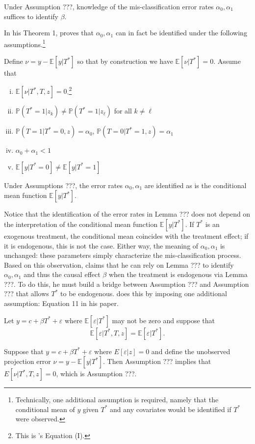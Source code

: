\begin{lem}[Mahajan A2]
Under Assumption ???, knowledge of the mis-classification error rates $\alpha_0, \alpha_1$ suffices to identify $\beta$.
\end{lem}

In his Theorem 1, \cite{Mahajan} proves that $\alpha_0, \alpha_1$ can in fact be identified under the following assumptions.\footnote{Technically, one additional assumption is required, namely that the conditional mean of $y$ given $T^*$ and any covariates would be identified if $T^*$ were observed.}
\begin{assump}[Mahajan A1] Define $\nu = y - \mathbb{E}[y|T^*]$ so that by construction we have $\mathbb{E}[\nu|T^*]=0$. Assume that
  \begin{enumerate}[(i)]
    \item $\mathbb{E}[\nu|T^*,T,z] = 0$.\footnote{This is \citeauthor{Mahajan}'s Equation (I).}
    \item $\mathbb{P}(T^*=1|z_k)\neq \mathbb{P}(T^*=1|z_\ell)$ for all $k\neq \ell$
    \item $\mathbb{P}(T = 1| T^* = 0, z) = \alpha_0$,  $\mathbb{P}(T = 0| T^* = 1, z) = \alpha_1$
    \item $\alpha_0 + \alpha_1 < 1$
    \item $\mathbb{E}[y|T^*=0]\neq \mathbb{E}[y|T^*=1]$
  \end{enumerate}
\end{assump}
\begin{lem}
  Under Assumptions ???, the error rates $\alpha_0, \alpha_1$ are identified as is the conditional mean function $\mathbb{E}[y|T^*]$.
\end{lem}

Notice that the identification of the error rates in Lemma ??? does not depend on the interpretation of the conditional mean function $\mathbb{E}[y|T^*]$.
If $T^*$ is an exogenous treatment, the conditional mean coincides with the treatment effect; if it is endogenous, this is not the case.
Either way, the meaning of $\alpha_0, \alpha_1$ is unchanged: these parameters simply characterize the mis-classification process. 
Based on this observation, \cite{Mahajan} claims that he can rely on Lemma ??? to identify $\alpha_0,\alpha_1$ and thus the causal effect $\beta$ when the treatment is endogenous via Lemma ???.
To do this, he must build a bridge between Assumption ??? and Assumption ??? that allows $T^*$ to be endogenous.
\cite{Mahajan} does this by imposing one additional assumption: Equation 11 in his paper.
\begin{assump}
  Let $y = c + \beta T^* + \varepsilon$ where $\mathbb{E}[\varepsilon|T^*]$ may not be zero and suppose that 
  \[\mathbb{E}[\varepsilon|T^*,T,z] = \mathbb{E}[\varepsilon|T^*].\]
\end{assump}
\begin{lem}
  Suppose that $y = c + \beta T^* + \varepsilon$ where $E[\varepsilon|z]=0$ and define the unobserved projection error $\nu = y - \mathbb{E}[y|T^*]$.
  Then Assumption ??? implies that $E[\nu|T^*,T,z]=0$, which is Assumption ???.
\end{lem}

